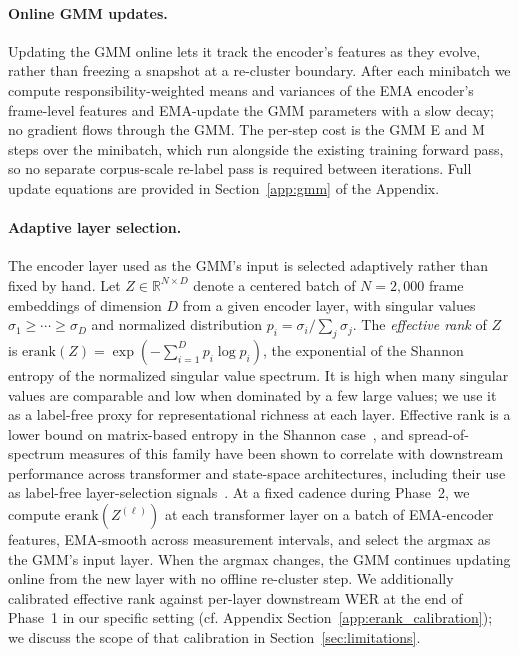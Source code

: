 \documentclass[9pt,twocolumn]{article}
\theoremstyle{plain}
\theoremstyle{definition}
\theoremstyle{remark}
\begin{document}
\paragraph{Online GMM updates.} Updating the GMM online lets it track the encoder's features as they evolve, rather than freezing a snapshot at a re-cluster boundary. After each minibatch we compute responsibility-weighted means and variances of the EMA encoder's frame-level features and EMA-update the GMM parameters with a slow decay; no gradient flows through the GMM. The per-step cost is the GMM E and M steps over the minibatch, which run alongside the existing training forward pass, so no separate corpus-scale re-label pass is required between iterations. Full update equations are provided in Section~\ref{app:gmm} of the Appendix.


\paragraph{Adaptive layer selection.} The encoder layer used as the GMM's input is selected adaptively rather than fixed by hand. Let $Z \in \mathbb{R}^{N \times D}$ denote a centered batch of $N{=}2{,}000$ frame embeddings of dimension $D$ from a given encoder layer, with singular values $\sigma_1 \geq \cdots \geq \sigma_D$ and normalized distribution $p_i = \sigma_i / \sum_j \sigma_j$. The \emph{effective rank} of $Z$ is
$\mathrm{erank}(Z) = \exp\!\left(-\sum_{i=1}^{D} p_i \log p_i\right)
\label{eq:erank}
$,
the exponential of the Shannon entropy of the normalized singular value spectrum. It is high when many singular values are comparable and low when dominated by a few large values; we use it as a label-free proxy for representational richness at each layer. Effective rank is a lower bound on matrix-based entropy in the Shannon case~\citep[Theorem~1]{skean2025layer}, and spread-of-spectrum measures of this family have been shown to correlate with downstream performance across transformer and state-space architectures, including their use as label-free layer-selection signals~\citep{skean2025layer,garrido2023rankme}. At a fixed cadence during Phase~2, we compute $\mathrm{erank}(Z^{(\ell)})$ at each transformer layer on a batch of EMA-encoder features, EMA-smooth across measurement intervals, and select the argmax as the GMM's input layer. When the argmax changes, the GMM continues updating online from the new layer with no offline re-cluster step. We additionally calibrated effective rank against per-layer downstream WER at the end of Phase~1 in our specific setting (cf. Appendix Section~\ref{app:erank_calibration}); we discuss the scope of that calibration in Section~\ref{sec:limitations}.
 
\end{document}
